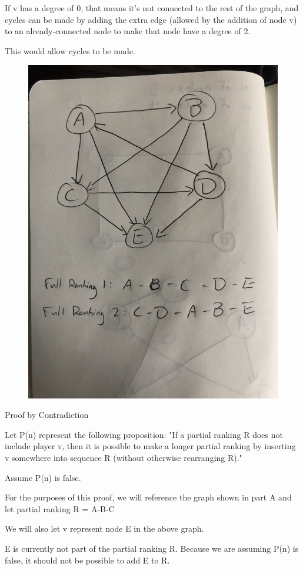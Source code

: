 \documentclass{6042}
\begin{document}
If v has a degree of 0, that means it's not connected to the rest of the graph, and cycles can be made by adding the extra edge (allowed by the addition of node v) to an already-connected node to make that node have a degree of 2.

This would allow cycles to be made.






\begin{figure}[h!]
    \includegraphics[angle=-90, origin=c, width=0.6\linewidth]{prob2graph.jpg}

\end{figure}


Proof by Contradiction

Let P(n) represent the following proposition: "If a partial ranking R does not include player v, then it is possible to make a
longer partial ranking by inserting v somewhere into sequence R (without otherwise rearranging R)."

Assume P(n) is false.

For the purposes of this proof, we will reference the graph shown in part A 
and let partial ranking R = A-B-C

We will also let v represent node E in the above graph.

E is currently not part of the partial ranking R. 
Because we are assuming P(n) is false, it should not be possible to add E to R.
\end{document}
